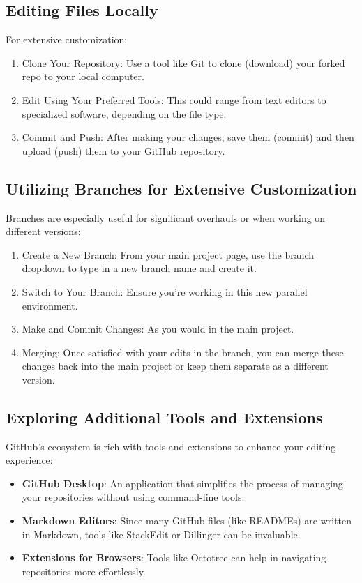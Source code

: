 \documentclass[a4paper,12pt]{book}
\begin{document}
\subsection*{Editing Files Locally}
For extensive customization:

\begin{enumerate}
    \item Clone Your Repository: Use a tool like Git to clone (download) your forked repo to your local computer.
    \item Edit Using Your Preferred Tools: This could range from text editors to specialized software, depending on the file type.
    \item Commit and Push: After making your changes, save them (commit) and then upload (push) them to your GitHub repository.
\end{enumerate}

\subsection*{Utilizing Branches for Extensive Customization}
Branches are especially useful for significant overhauls or when working on different versions:

\begin{enumerate}
    \item Create a New Branch: From your main project page, use the branch dropdown to type in a new branch name and create it.
    \item Switch to Your Branch: Ensure you're working in this new parallel environment.
    \item Make and Commit Changes: As you would in the main project.
    \item Merging: Once satisfied with your edits in the branch, you can merge these changes back into the main project or keep them separate as a different version.
\end{enumerate}

\subsection*{Exploring Additional Tools and Extensions}
GitHub's ecosystem is rich with tools and extensions to enhance your editing experience:

\begin{itemize}
    \item \textbf{GitHub Desktop}: An application that simplifies the process of managing your repositories without using command-line tools.
    \item \textbf{Markdown Editors}: Since many GitHub files (like READMEs) are written in Markdown, tools like StackEdit or Dillinger can be invaluable.
    \item \textbf{Extensions for Browsers}: Tools like Octotree can help in navigating repositories more effortlessly.
\end{itemize}
\end{document}
